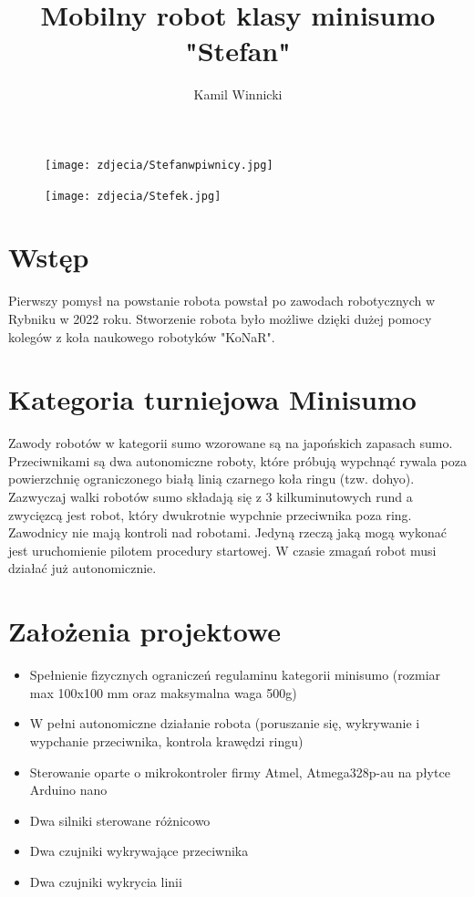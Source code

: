 \documentclass[polish,polish,a4paper]{article}
\title{Mobilny robot klasy minisumo "Stefan" }
\author{Kamil Winnicki}
\begin{document}





\tableofcontents
\newpage
\begin{figure}[!htb]
       \begin{minipage}{0.3\textwidth}
         \centering
         \texttt{[image: zdjecia/Stefanwpiwnicy.jpg]}

       \end{minipage}\hspace{34mm}
       \begin{minipage}{0.3\textwidth}
         \centering
         \texttt{[image: zdjecia/Stefek.jpg]}

       \end{minipage}
        \end{figure}

\section{Wstęp}

Pierwszy pomysł na powstanie robota powstał po zawodach robotycznych w Rybniku w 2022 roku. Stworzenie robota było możliwe dzięki dużej pomocy kolegów z koła naukowego robotyków "KoNaR".

\section{Kategoria turniejowa Minisumo}

Zawody robotów w kategorii sumo wzorowane są na japońskich zapasach sumo. Przeciwnikami są dwa autonomiczne roboty, które próbują wypchnąć rywala poza powierzchnię ograniczonego białą linią czarnego koła ringu (tzw. dohyo). Zazwyczaj walki robotów sumo składają się z 3 kilkuminutowych rund a zwycięzcą jest robot, który dwukrotnie wypchnie przeciwnika poza ring. Zawodnicy nie mają kontroli nad robotami. Jedyną rzeczą jaką mogą wykonać  jest uruchomienie pilotem procedury startowej. W czasie zmagań robot musi działać już autonomicznie.  

\section{Założenia projektowe}
\begin{itemize}
  \item Spełnienie fizycznych ograniczeń regulaminu kategorii minisumo (rozmiar max 100x100 mm oraz maksymalna waga 500g)
  \item W pełni autonomiczne działanie robota (poruszanie się, wykrywanie i wypchanie przeciwnika, kontrola krawędzi ringu) 
  \item Sterowanie oparte o mikrokontroler firmy Atmel, Atmega328p-au na płytce Arduino nano
  \item Dwa silniki sterowane różnicowo
  \item Dwa czujniki wykrywające przeciwnika
  \item Dwa czujniki wykrycia linii

\end{itemize}
\end{document}
